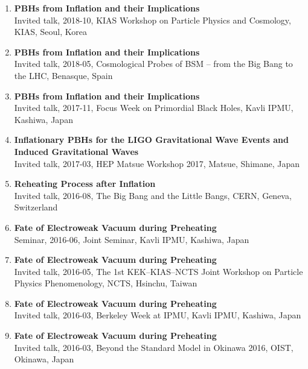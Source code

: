\begin{enumerate}
\item \textbf{PBHs from Inflation and their Implications}\\ Invited talk, 2018-10, KIAS Workshop on Particle Physics and Cosmology, KIAS, Seoul, Korea

\item \textbf{PBHs from Inflation and their Implications}\\ Invited talk, 2018-05, Cosmological Probes of BSM -- from the Big Bang to the LHC, Benasque, Spain

\item \textbf{PBHs from Inflation and their Implications}\\ Invited talk, 2017-11, Focus Week on Primordial Black Holes, Kavli IPMU, Kashiwa, Japan

\item \textbf{Inflationary PBHs for the LIGO Gravitational Wave Events and Induced Gravitational Waves}\\ Invited talk, 2017-03, HEP Matsue Workshop 2017, Matsue, Shimane, Japan

\item \textbf{Reheating Process after Inflation}\\ Invited talk, 2016-08, The Big Bang and the Little Bangs, CERN, Geneva, Switzerland

\item \textbf{Fate of Electroweak Vacuum during Preheating}\\ Seminar, 2016-06, Joint Seminar, Kavli IPMU, Kashiwa, Japan

\item \textbf{Fate of Electroweak Vacuum during Preheating}\\ Invited talk, 2016-05, The 1st KEK--KIAS--NCTS Joint Workshop on Particle Physics Phenomenology, NCTS, Hsinchu, Taiwan

\item \textbf{Fate of Electroweak Vacuum during Preheating}\\ Invited talk, 2016-03, Berkeley Week at IPMU, Kavli IPMU, Kashiwa, Japan

\item \textbf{Fate of Electroweak Vacuum during Preheating}\\ Invited talk, 2016-03, Beyond the Standard Model in Okinawa 2016, OIST, Okinawa, Japan
\end{enumerate}
